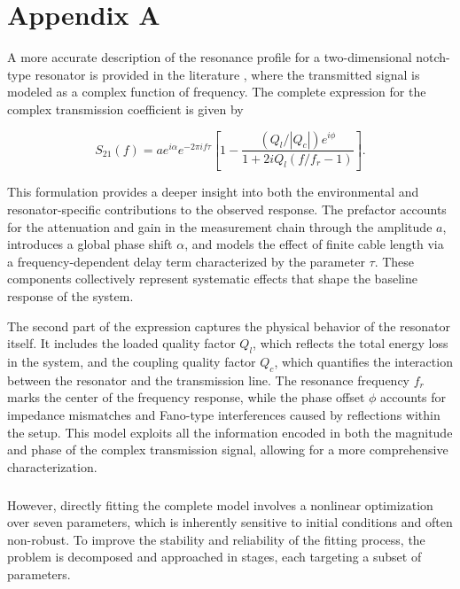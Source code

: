 \chapter*{Appendix A} 
\label{app:AppendixA}

A more accurate description of the resonance profile for a two-dimensional notch-type resonator is provided in the literature \cite{Gao2008}, where the transmitted signal is modeled as a complex function of frequency. 
The complete expression for the complex transmission coefficient is given by

\begin{equation}
S_{21}(f) = ae^{i\alpha}e^{-2\pi i f \tau}\left[ 1 - \frac{(Q_l/|Q_c|)e^{i\phi}}{1 + 2iQ_l(f/f_r -1)} \right].
\end{equation}

This formulation provides a deeper insight into both the environmental and resonator-specific contributions to the observed response. 
The prefactor accounts for the attenuation and gain in the measurement chain through the amplitude $a$, introduces a global phase shift $\alpha$, and models the effect of finite cable length via a frequency-dependent delay term characterized by the parameter $\tau$. 
These components collectively represent systematic effects that shape the baseline response of the system.

The second part of the expression captures the physical behavior of the resonator itself. 
It includes the loaded quality factor $Q_l$, which reflects the total energy loss in the system, and the coupling quality factor $Q_c$, which quantifies the interaction between the resonator and the transmission line. 
The resonance frequency $f_r$ marks the center of the frequency response, while the phase offset $\phi$ accounts for impedance mismatches and Fano-type interferences caused by reflections within the setup.
This model exploits all the information encoded in both the magnitude and phase of the complex transmission signal, allowing for a more comprehensive characterization. 

\paragraph{}
However, directly fitting the complete model involves a nonlinear optimization over seven parameters, which is inherently sensitive to initial conditions and often non-robust. 
To improve the stability and reliability of the fitting process, the problem is decomposed and approached in stages, each targeting a subset of parameters.

